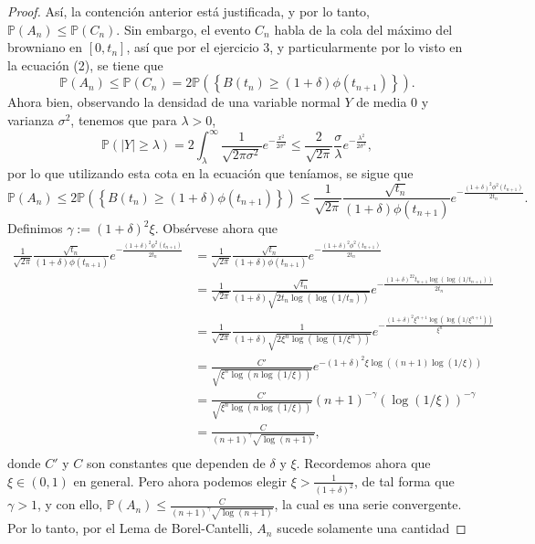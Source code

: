 \documentclass[letterpaper]{article}
\renewcommand{\P}{\mathbb{P}}
\newcommand{\1}{\mathds{1}}
\theoremstyle{definition}
\theoremstyle{definition}
\theoremstyle{definition}
\theoremstyle{definition}
\theoremstyle{definition}
\begin{document}
\begin{enumerate}
\begin{proof}
      Así, la contención anterior está justificada, y por lo tanto, $\P\left(A_n\right)\leq \P\left(C_n\right)$. Sin embargo, el evento
      $C_n$ habla de la cola del máximo del browniano en $[0,t_n]$, así que por el ejercicio 3, y particularmente por lo 
      visto en la ecuación (2), se tiene que
      \[
      \P(A_n)\leq\P(C_n)=2\P\left(\left\{B(t_n)\geq (1+\delta)\phi(t_{n+1})\right\}\right).
      \]
      Ahora bien, observando la densidad de una variable normal $Y$ de media 0 y varianza $\sigma^2$, tenemos que para $\lambda>0$,
      \[
      \P\left(|Y|\geq\lambda\right)=2\int_{\lambda}^{\infty}\frac{1}{\sqrt{2\pi \sigma^{2}}}e^{-\frac{x^2}{2\sigma^2}}\leq\frac{2}{\sqrt{2\pi}}\frac{\sigma}{\lambda}e^{-\frac{\lambda^2}{2\sigma^2 }},
      \]
      por lo que utilizando esta cota en la ecuación que teníamos, se sigue que
      \[
        \P(A_n)\leq2\P\left(\left\{B(t_n)\geq (1+\delta)\phi(t_{n+1})\right\}\right)\leq \frac{1}{\sqrt{2\pi}}\frac{\sqrt{t_n}}{(1+\delta)\phi(t_{n+1})}e^{-\frac{(1+\delta)^2\phi^2(t_{n+1})}{2t_n}}.
      \]
      Definimos $\gamma:=(1+\delta)^2\xi$. Obsérvese ahora que
      \begin{align*}
        \frac{1}{\sqrt{2\pi}}\frac{\sqrt{t_n}}{(1+\delta)\phi(t_{n+1})}e^{-\frac{(1+\delta)^2\phi^2(t_{n+1})}{2t_n}}&=\frac{1}{\sqrt{2\pi}}\frac{\sqrt{t_n}}{(1+\delta)\phi(t_{n+1})}e^{-\frac{(1+\delta)^2\phi^2(t_{n+1})}{2t_n}}\\
        &=\frac{1}{\sqrt{2\pi}}\frac{\sqrt{t_n}}{(1+\delta)\sqrt{2t_n\log(\log(1/t_n))}}e^{-\frac{(1+\delta)^22t_{n+1}\log(\log(1/t_{n+1}))}{2t_n}}\\
        &=\frac{1}{\sqrt{2\pi}}\frac{1}{(1+\delta)\sqrt{2\xi^n\log(\log(1/\xi^n))}}e^{-\frac{(1+\delta)^2\xi^{n+1}\log(\log(1/\xi^{n+1}))}{\xi^n}}\\
        &=\frac{C'}{\sqrt{\xi^n\log(n\log(1/\xi))}}e^{-(1+\delta)^2\xi\log((n+1)\log(1/\xi))}\\
        &=\frac{C'}{\sqrt{\xi^n\log(n\log(1/\xi))}}(n+1)^{-\gamma}(\log(1/\xi))^{-\gamma}\\
        &=\frac{C}{(n+1)^{\gamma}\sqrt{\log(n+1)}},\\
      \end{align*}
      donde $C'$ y $C$ son constantes que dependen de $\delta$ y $\xi$. Recordemos ahora que $\xi \in (0,1)$ en general.
      Pero ahora podemos elegir $\xi>\frac{1}{(1+\delta)^2}$, de tal forma que $\gamma>1$, y
      con ello, $\P(A_n)\leq \frac{C}{(n+1)^{\gamma}\sqrt{\log(n+1)}}$, la cual es una serie
      convergente. Por lo tanto, por el Lema de Borel-Cantelli, $A_n$ sucede solamente una cantidad

\end{proof}
\end{enumerate}
\end{document}
